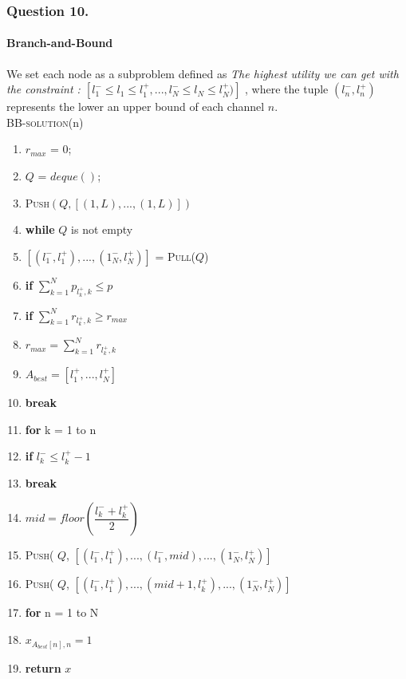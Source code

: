 \documentclass[11pt, oneside]{report}
\begin{document}
\subsubsection{Question 10. }
\paragraph{Branch-and-Bound} We set each node as a subproblem defined as \textit{The highest utility we can get with the constraint : $[ l_{1}^{-} \leq l_1 \leq l_{1}^{+},...,l_{N}^{-}\leq l_N \leq l_{N}^{+})]$ }, where the tuple $( l_n^{-}, l_n^{+} )$ represents the lower an upper bound of each channel $n$. \\

\noindent\textsc{BB-solution}(n)
\begin{enumerate}[1\ ]
\setlength{\topsep}{0.05ex}
\setlength{\itemsep}{0.05ex}
\item $r_{max}$ = 0;
\item $Q$ = $deque()$;
\item \textsc{Push}$(Q, [(1,L),...,(1,L)])$
\item \textbf{while} $Q$ is not empty
\item \qquad $[(l_1^{-},l_1^{+}),...,(1_N^{-},l_N^{+})]$ = \textsc{Pull}($Q$)
\item \qquad \textbf{if} $\sum_{k=1}^{N} p_{l_{k}^{+}, k} \leq p$
\item \qquad \qquad \textbf{if} $\sum_{k=1}^{N} r_{l_{k}^{+}, k} \geq r_{max}$
\item \qquad \qquad \qquad $r_{max} = \sum_{k=1}^{N} r_{l_{k}^{+}, k}$
\item \qquad \qquad \qquad $A_{best} = [l_1^{+},..., l_N^{+}]$
\item \qquad \qquad \qquad \textbf{break}
\item \qquad \textbf{for} k = 1 to n
\item \qquad \qquad \textbf{if} $l_k^{-} \leq l_k^{+} - 1$
\item \qquad \qquad \qquad \textbf{break}
\item \qquad $mid = floor(\dfrac{l_k^{-} + l_k^{+}}{2})$
\item \qquad \textsc{Push}( $Q$, $[(l_1^{-},l_1^{+}),...,(l_1^{-},mid),...,(1_N^{-},l_N^{+})]$
\item \qquad \textsc{Push}( $Q$, $[(l_1^{-},l_1^{+}),...,(mid+1,l_k^{+}),...,(1_N^{-},l_N^{+})]$
\item \textbf{for} n = 1 to N
\item \qquad $x_{A_{best}[n],n} = 1$
\item \textbf{return} $x$
\end{enumerate}
\end{document}
